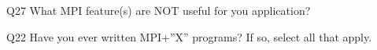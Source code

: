 \begin{description}%
\item{Q27} What MPI feature(s) are NOT useful for you application?%
\item{Q22} Have you ever written MPI+”X” programs? If so, select all that apply.%
\end{description}%
